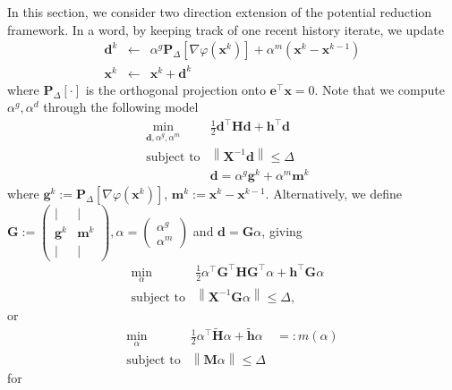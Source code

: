 \documentclass{article}
\newcommand{\assign}{:=}
\newcommand{\backassign}{=:}
\newcommand{\cdummy}{\cdot}
\newcommand{\x}{\mathbf{x}}
\newcommand{\0}{\textbf{0}}
\newcommand{\e}{\mathbf{e}}
\newcommand{\X}{\mathbf{X}}
\newcommand{\tmH}{\mathbf{H}}
\newcommand{\h}{\mathbf{h}}
\newcommand{\tmP}{\mathbf{P}}
\newcommand{\m}{\mathbf{m}}
\newcommand{\g}{\mathbf{g}}
\newcommand{\M}{\mathbf{M}}
\newcommand{\tmd}{\mathbf{d}}
\newcommand{\G}{\mathbf{G}}
\begin{document}
In this section, we consider two direction extension of the potential
reduction framework. In a word, by keeping track of one recent history
iterate, we update
\begin{eqnarray*}
  \tmd^k & \leftarrow & \alpha^g \tmP_{\Delta} \left[ \nabla \varphi \left(
  \x^k \right) \right] + \alpha^m \left( \x^k - \x^{k - 1} \right)\\
  \x^k & \leftarrow & \x^k + \tmd^k
\end{eqnarray*}
where $\tmP_{\Delta} [\cdummy]$ is the orthogonal projection onto $\e^{\top}
\x = 0$. Note that we compute $\alpha^g, \alpha^d$ through the following model
\begin{eqnarray*}
  \min_{\tmd, \alpha^g, \alpha^m} & \frac{1}{2} \tmd^{\top} \tmH \tmd +
  \h^{\top} \tmd & \\
  \text{subject to} & \left\| \X^{- 1} \tmd \right\| \leq \Delta & \\
  & \tmd = \alpha^g \g^k + \alpha^m \m^k & 
\end{eqnarray*}
where $\g^k \assign \tmP_{\Delta} \left[ \nabla \varphi \left( \x^k \right)
\right]$, $\m^k \assign \x^k - \x^{k - 1}$. Alternatively, we define $\G
\assign \left(\begin{array}{cc}
  | & |\\
  \g^k & \m^k\\
  | & |
\end{array}\right), \alpha = \left(\begin{array}{c}
  \alpha^g\\
  \alpha^m
\end{array}\right)$ and $\tmd = \G \alpha$, giving
\begin{eqnarray*}
  \min_{\alpha} & \frac{1}{2} \alpha^{\top} \G^{\top} \tmH \G^{\top} \alpha +
  \h^{\top} \G \alpha & \\
  \text{subject to} & \left\| \X^{- 1} \G \alpha \right\| \leq \Delta, & 
\end{eqnarray*}
or
\begin{eqnarray*}
  \min_{\alpha} & \frac{1}{2} \alpha^{\top} \widetilde{\tmH} \alpha +
  \widetilde{\h} \alpha & \backassign m (\alpha)\\
  \text{subject to} & \left\| \M \alpha \right\| \leq \Delta & 
\end{eqnarray*}
for
\end{document}
